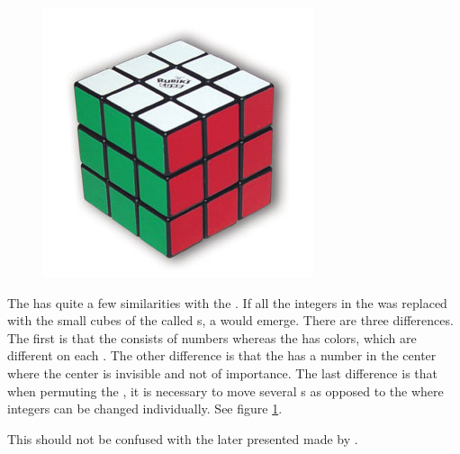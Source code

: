 \begin{figure}[htb]
	\centering
		\includegraphics[scale=0.4]{input/pics/rubiksCube}
	\caption{}
	\label{fig:rubiksCube}
\end{figure}

The \rubik{} has quite a few similarities with the \mcube{}. If all the integers in the \mcube{} was replaced with the small cubes of the \rubik{} called \cpiece{}s, a \rubik{} would emerge.
There are three differences. 
The first is that the \mcube{} consists of numbers whereas the \rubik{} has colors, which are different on each \face{}.
The other difference is that the \mcube{} has a number in the center where the \rubik{} center is invisible and not of importance. 
The last difference is that when permuting the \rubik{}, it is necessary to move several \cpiece{}s as opposed to the \mcube{} where integers can be changed individually. See figure \ref{fig:rubiksCube}.

This \mcube{} should not be confused with the later presented \mcube{} made by \erno{}.
